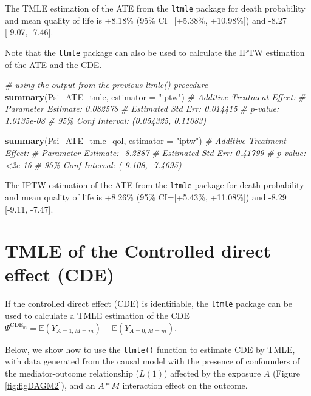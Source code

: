 \documentclass[
]{book}
\newenvironment{Shaded}{\begin{snugshade}}{\end{snugshade}}
\newcommand{\AttributeTok}[1]{\textcolor[rgb]{0.13,0.29,0.53}{#1}}
\newcommand{\CommentTok}[1]{\textcolor[rgb]{0.56,0.35,0.01}{\textit{#1}}}
\newcommand{\FunctionTok}[1]{\textcolor[rgb]{0.13,0.29,0.53}{\textbf{#1}}}
\newcommand{\NormalTok}[1]{#1}
\newcommand{\StringTok}[1]{\textcolor[rgb]{0.31,0.60,0.02}{#1}}
\begin{document}
The TMLE estimation of the ATE from the \texttt{ltmle} package for death probability and mean quality of life is +8.18\% (95\% CI={[}+5.38\%, +10.98\%{]}) and -8.27 {[}-9.07, -7.46{]}.

Note that the \texttt{ltmle} package can also be used to calculate the IPTW estimation of the ATE and the CDE.

\begin{Shaded}
\begin{Highlighting}[]
\CommentTok{\# using the output from the previous ltmle() procedure}
\FunctionTok{summary}\NormalTok{(Psi\_ATE\_tmle, }\AttributeTok{estimator =} \StringTok{"iptw"}\NormalTok{)}
\CommentTok{\# Additive Treatment Effect:}
\CommentTok{\#    Parameter Estimate:  0.082578 }
\CommentTok{\#     Estimated Std Err:  0.014415 }
\CommentTok{\#               p{-}value:  1.0135e{-}08 }
\CommentTok{\#     95\% Conf Interval: (0.054325, 0.11083) }

\FunctionTok{summary}\NormalTok{(Psi\_ATE\_tmle\_qol, }\AttributeTok{estimator =} \StringTok{"iptw"}\NormalTok{)}
\CommentTok{\# Additive Treatment Effect:}
\CommentTok{\#    Parameter Estimate:  {-}8.2887 }
\CommentTok{\#     Estimated Std Err:  0.41799 }
\CommentTok{\#               p{-}value:  \textless{}2e{-}16 }
\CommentTok{\#     95\% Conf Interval: ({-}9.108, {-}7.4695) }
\end{Highlighting}
\end{Shaded}

The IPTW estimation of the ATE from the \texttt{ltmle} package for death probability and mean quality of life is +8.26\% (95\% CI={[}+5.43\%, +11.08\%{]}) and -8.29 {[}-9.11, -7.47{]}.

\hypertarget{tmle-of-the-controlled-direct-effect-cde}{%
\section{TMLE of the Controlled direct effect (CDE)}\label{tmle-of-the-controlled-direct-effect-cde}}

If the controlled direct effect (CDE) is identifiable, the \texttt{ltmle} package can be used to calculate a TMLE estimation of the CDE \(\Psi^{\text{CDE}_m} = \mathbb{E}(Y_{A=1,M=m}) - \mathbb{E}(Y_{A=0,M=m})\).

Below, we show how to use the \texttt{ltmle()} function to estimate CDE by TMLE, with data generated from the causal model with the presence of confounders of the mediator-outcome relationship (\(L(1)\)) affected by the exposure \(A\) (Figure \ref{fig:figDAGM2}), and an \(A \ast M\) interaction effect on the outcome.
\end{document}
